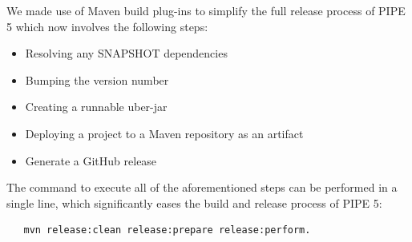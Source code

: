 We made use of Maven build plug-ins to simplify the full release process of PIPE 5 which now involves the following steps:
\begin{itemize} 
    \item Resolving any SNAPSHOT dependencies
    \item Bumping the version number
    \item Creating a runnable uber-jar
    \item Deploying a project to a Maven repository as an artifact
    \item Generate a GitHub release 
\end{itemize}
The command to execute all of the aforementioned steps can be performed in a single line, which significantly eases the build and release process of PIPE 5:
\begin{lstlisting}
   mvn release:clean release:prepare release:perform.
\end{lstlisting}